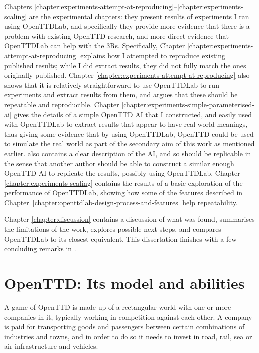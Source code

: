 \documentclass[logo,msc,dsti]{style/infthesis}    %
\begin{document}
{Chapters \ref{chapter:experiments-attempt-at-reproducing}--\ref{chapter:experiments-scaling} are the experimental chapters: they present results of experiments I ran using OpenTTDLab, and specifically they provide more evidence that there is a problem with existing OpenTTD research, and more direct evidence that OpenTTDLab can help with the 3Rs. Specifically, Chapter \ref{chapter:experiments-attempt-at-reproducing} explains how I attempted to reproduce existing published results; while I did extract results, they did not fully match the ones originally published. Chapter \ref{chapter:experiments-attempt-at-reproducing} also shows that it is relatively straightforward to use OpenTTDLab to run experiments and extract results from them, and argues that these should be repeatable and reproducible. Chapter \ref{chapter:experiments-simple-parameterised-ai} gives the details of a simple OpenTTD AI that I constructed, and easily used with OpenTTDLab to extract results that appear to have real-world meanings, thus giving some evidence that by using OpenTTDLab, OpenTTD could be used to simulate the real world as part of the secondary aim of this work as mentioned earlier.  also contains a clear description of the AI, and so should be replicable in the sense that another author should be able to construct a similar enough OpenTTD AI to replicate the results, possibly using OpenTTDLab. Chapter \ref{chapter:experiments-scaling} contains the results of a basic exploration of the performance of OpenTTDLab, showing how some of the features described in Chapter~\ref{chapter:openttdlab-design-process-and-features} help repeatability.

Chapter \ref{chapter:discussion} contains a discussion of what was found, summarises the limitations of the work, explores possible next steps, and compares OpenTTDLab to its closest equivalent. This dissertation finishes with a few concluding remarks in .

\chapter{OpenTTD: Its model and abilities}
\label{chapter:openttd-model-and-abilities}

A game of OpenTTD is made up of a rectangular world with one or more companies in it, typically working in competition against each other. A company is paid for transporting goods and passengers between certain combinations of industries and towns, and in order to do so it needs to invest in road, rail, sea or air infrastructure and vehicles.

}
\end{document}
